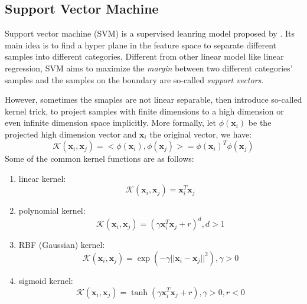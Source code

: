\documentclass[sigconf]{acmart}
\newcommand{\bx}{\mathbf{x}}
\begin{document}
	
		
	
	\subsection{Support Vector Machine}
	Support vector machine (SVM) is a supervised leanring model proposed by \citet{cortes1995support}. Its main idea is to find a hyper plane in the feature space to separate different samples into different categories, Different from other linear model like linear regression, SVM aims to maximize the \textit{margin} between two different categories' samples and the samples on the boundary are so-called \textit{support vectors}. 
	
	However, sometimes the smaples are not linear separable, then \citet{cristianini1999introduction} introduce so-called kernel trick, to project samples with finite dimensions to a high dimension or even infinite dimension space implicitly. More formally, let $\phi(\mathbf{x}_i)$ be the projected high dimension vector and $\mathbf{x}_i$ the original vector, we have:
	\begin{equation}
	\mathcal{K}(\mathbf{x}_i,\mathbf{x}_j)=<\phi(\mathbf{x}_i),\phi(\mathbf{x}_j)>=\phi(\mathbf{x}_i)^T\phi(\mathbf{x}_j)
	\end{equation}
	Some of the common kernel functions are as follows:
	\begin{enumerate}
		\item linear kernel:
		\begin{equation}
		\mathcal{K}(\mathbf{x}_i,\bx_j)=\bx_i^T\bx_j
		\end{equation}
		
		\item polynomial kernel:
		\begin{equation}
		\mathcal{K}(\bx_i,\bx_j)=(\gamma \bx_i^T\bx_j + r)^d, d>1
		\end{equation}
		
		\item RBF (Gaussian) kernel:
		\begin{equation}
		\mathcal{K}(\bx_i,\bx_j)=\exp(-\gamma ||\bx_i-\bx_j||^2),\gamma>0
		\end{equation}
		
		\item sigmoid kernel:  
		\begin{equation}
		\mathcal{K}(\bx_i,\bx_j)=\tanh(\gamma \bx_i^T\bx_j + r ), \gamma>0, r<0
		\end{equation}
	\end{enumerate}
	
\end{document}
